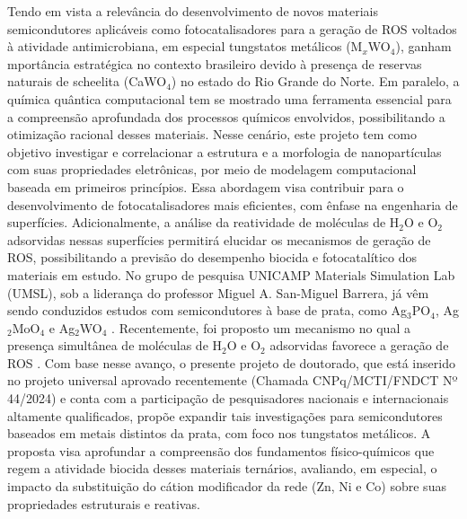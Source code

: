 Tendo em vista a relevância do desenvolvimento de novos materiais semicondutores aplicáveis como fotocatalisadores para a geração de ROS voltados à atividade antimicrobiana, em especial tungstatos metálicos (M$_x$WO$_4$), ganham mportância estratégica no contexto brasileiro devido à presença de reservas naturais de scheelita (CaWO$_4$) no estado do Rio Grande do Norte. Em paralelo, a química quântica computacional tem se mostrado uma ferramenta essencial para a compreensão aprofundada dos processos químicos envolvidos, possibilitando a otimização racional desses materiais. Nesse cenário, este projeto tem como objetivo investigar e correlacionar a estrutura e a morfologia de nanopartículas com suas propriedades eletrônicas, por meio de modelagem computacional baseada em primeiros princípios. Essa abordagem visa contribuir para o desenvolvimento de fotocatalisadores mais eficientes, com ênfase na engenharia de superfícies. Adicionalmente, a análise da reatividade de moléculas de H$_2$O e O$_2$ adsorvidas nessas superfícies permitirá elucidar os mecanismos de geração de ROS, possibilitando a previsão do desempenho biocida e fotocatalítico dos materiais em estudo. No grupo de pesquisa UNICAMP Materials Simulation Lab (UMSL), sob a liderança do professor Miguel A. San-Miguel Barrera, já vêm sendo conduzidos estudos com semicondutores à base de prata, como Ag$_3$PO$_4$, Ag$_2$MoO$_4$ e Ag$_2$WO$_4$ \cite{gouveia2024whats,dorini2025mapping,roca2021selective}. Recentemente, foi proposto um mecanismo no qual a presença simultânea de moléculas de H$_2$O e O$_2$ adsorvidas favorece a geração de ROS \cite{lipsky2023tale}. Com base nesse avanço, o presente projeto de doutorado, que está inserido no projeto universal aprovado recentemente (Chamada CNPq/MCTI/FNDCT Nº 44/2024) e conta com a participação de pesquisadores nacionais e internacionais altamente qualificados, propõe expandir tais investigações para semicondutores baseados em metais distintos da prata, com foco nos tungstatos metálicos. A proposta visa aprofundar a compreensão dos fundamentos físico-químicos que regem a atividade biocida desses materiais ternários, avaliando, em especial, o impacto da substituição do cátion modificador da rede (Zn, Ni e Co) sobre suas propriedades estruturais e reativas.